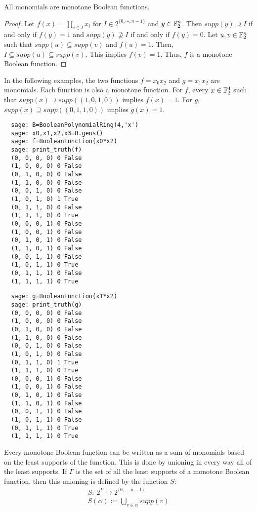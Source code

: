 \begin{theorem}
  All monomials are monotone Boolean functions.
\end{theorem}

\begin{proof}
  Let $f(x)=\prod_{i\in I}x_i$ for $I\in2^{\{0,\cdots,n-1\}}$ and
  $y\in\mathbb{F}_2^n$. Then $supp(y)\supseteq I$ if and only if $f(y)=1$ and
  $supp(y) \not\supseteq I$ if and only if $f(y)=0$.
  Let $u,v\in\mathbb{F}_2^n$ such that $supp(u)\subseteq supp(v)$ and $f(u)=1$.
  Then, $I\subseteq supp(u) \subseteq supp(v)$. This implies $f(v)=1$. Thus,
  $f$ is a monotone Boolean function.
\end{proof}

\begin{example}
  In the following examples, the two functions $f=x_0x_2$ and $g=x_1x_2$
  are monomials. Each function is also a monotone function. For $f$, every
  $x\in\mathbb{F}_2^4$ such that $supp(x)\supseteq supp((1,0,1,0))$ implies
  $f(x)=1$. For $g$, $supp(x)\supseteq supp( (0,1,1,0) )$ implies $g(x)=1$.
  \begin{verbatim}
  sage: B=BooleanPolynomialRing(4,'x')
  sage: x0,x1,x2,x3=B.gens()
  sage: f=BooleanFunction(x0*x2)
  sage: print_truth(f)
  (0, 0, 0, 0) 0 False
  (1, 0, 0, 0) 0 False
  (0, 1, 0, 0) 0 False
  (1, 1, 0, 0) 0 False
  (0, 0, 1, 0) 0 False
  (1, 0, 1, 0) 1 True
  (0, 1, 1, 0) 0 False
  (1, 1, 1, 0) 0 True
  (0, 0, 0, 1) 0 False
  (1, 0, 0, 1) 0 False
  (0, 1, 0, 1) 0 False
  (1, 1, 0, 1) 0 False
  (0, 0, 1, 1) 0 False
  (1, 0, 1, 1) 0 True
  (0, 1, 1, 1) 0 False
  (1, 1, 1, 1) 0 True
  \end{verbatim}

  \begin{verbatim}
  sage: g=BooleanFunction(x1*x2)
  sage: print_truth(g)
  (0, 0, 0, 0) 0 False
  (1, 0, 0, 0) 0 False
  (0, 1, 0, 0) 0 False
  (1, 1, 0, 0) 0 False
  (0, 0, 1, 0) 0 False
  (1, 0, 1, 0) 0 False
  (0, 1, 1, 0) 1 True
  (1, 1, 1, 0) 0 True
  (0, 0, 0, 1) 0 False
  (1, 0, 0, 1) 0 False
  (0, 1, 0, 1) 0 False
  (1, 1, 0, 1) 0 False
  (0, 0, 1, 1) 0 False
  (1, 0, 1, 1) 0 False
  (0, 1, 1, 1) 0 True
  (1, 1, 1, 1) 0 True
  \end{verbatim}
\end{example}

\par Every monotone Boolean function can be written as a sum of monomials
based on the least supports of the function. This is done by unioning in
every way all of the least supports. If $\Gamma$ is the set of all the least
supports of a monotone Boolean function, then this unioning is defined by
the function $S$:
\begin{align}
  S:\ 2^\Gamma \rightarrow 2^{\{0,\cdots,n-1\}} \\
  S(\alpha):=\bigcup_{v\in\alpha}supp(v)
\end{align}

